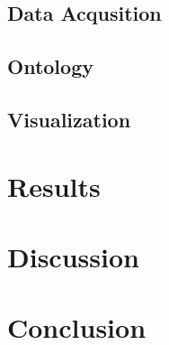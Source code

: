 \documentclass[runningheads]{llncs}
\begin{document}
\subsection{Data Acqusition}
\subsection{Ontology}
\subsection{Visualization}
\section{Results}

\section{Discussion}

\section{Conclusion}





\end{document}
